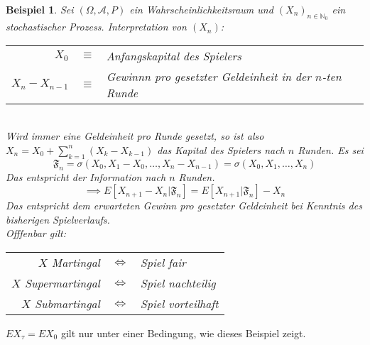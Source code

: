 \documentclass[a4paper,11pt]{book}
\newcommand{\N}{{\mathbb N}}
\def\AA{ \mathcal{A} }
\def\FF{ \mathfrak{F} }
\def\folgt{\ensuremath{\implies}}
\def\equizu{\ensuremath{\iff}}
\newtheorem{Bsp}{Beispiel}[chapter]
\theoremstyle{nonumberplain}
\begin{document}
\begin{Bsp} \label{Bsp8.3}
Sei $(\Omega, \AA, P)$ ein Wahrscheinlichkeitsraum und $(X_n)_{n\in\N_0}$ ein stochastischer Prozess. Interpretation von $(X_n)$:\\
\begin{tabular}[b]{rcl}
$X_0$ & $\equiv$ & Anfangskapital des Spielers\\
$X_n - X_{n-1}$ & $\equiv$ & Gewinnn pro gesetzter Geldeinheit in der $n$-ten Runde
\end{tabular}\\
Wird immer eine Geldeinheit pro Runde gesetzt, so ist also $X_n=X_0 + \sum_{k=1}^n (X_k - X_{k-1})$ das Kapital des Spielers nach $n$ Runden. Es sei
$$\FF_n = \sigma(X_0, X_1-X_0, \ldots, X_n - X_{n-1}) = \sigma(X_0, X_1, \ldots, X_n)$$
Das entspricht der Information nach $n$ Runden.
$$\folgt E[X_{n+1}-X_n|\FF_n] = E[X_{n+1}|\FF_n] - X_n$$
Das entspricht dem erwarteten Gewinn pro gesetzter Geldeinheit bei Kenntnis des bisherigen Spielverlaufs.\\
Offfenbar gilt:
\begin{tabular}[t]{rcp{}}
$X$ Martingal &$\equizu$& Spiel fair\\
$X$ Supermartingal &$\equizu$& Spiel nachteilig\\
$X$ Submartingal &$\equizu$& Spiel vorteilhaft\\
\end{tabular}

\end{Bsp}



$EX_{\tau} = EX_0$ gilt nur unter einer Bedingung, wie dieses Beispiel zeigt.
\end{document}
